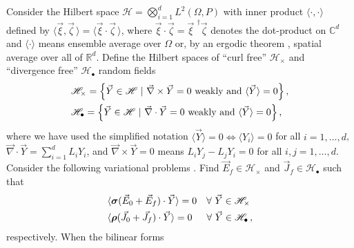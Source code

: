 \documentclass{cmslatex}
\newcommand\bsig{\mbox{\boldmath${\sigma}$}}
\newcommand\brho{\mbox{\boldmath${\rho}$}}
\begin{document}
Consider the Hilbert space $\mathscr{H}=\bigotimes_{i=1}^dL^2(\Omega,P)$ with inner
product $\langle\cdot,\cdot\rangle$ defined by $\langle\vec{\xi},\vec{\zeta}\,\rangle=\langle\vec{\xi}\cdot\vec{\zeta}\,\rangle$, where
$\vec{\xi}\cdot\vec{\zeta}=\vec{\xi}^{\;\,\dagger}\vec{\zeta}$ denotes the dot-product 
on $\mathbb{C}^d$ and $\langle\cdot\rangle$ means ensemble average over $\Omega$ or, by an
ergodic theorem \cite{Golden:CMP-473}, spatial average over all of
${\mathbb{R}}^d$. Define the Hilbert spaces \cite{Golden:CMP-473} of
``curl free'' $\mathscr{H}_\times$ and ``divergence free''
$\mathscr{H}_{\bullet}$ random fields  
%
\begin{align}\label{eq:curlfreeHilbert}
  &\mathscr{H}_\times=
  \left\{\vec{Y}\in \mathscr{H} \ | \ \vec{\nabla} \times\vec{Y}=0 \text{ weakly and }
    \langle\vec{Y}\rangle=0
  \right\}, \\
&\mathscr{H}_{\bullet}=
\left\{\vec{Y}\in \mathscr{H} \ | \ \vec{\nabla}\cdot\vec{Y}=0 \text{ weakly and }
    \langle\vec{Y}\rangle=0\right\},\notag 
\end{align}  
%
%
where we have used the simplified notation $\langle\vec{Y}\rangle=0 \iff \langle Y_i\rangle=0$ for
all $i=1,\ldots,d$, $\vec{\nabla}\cdot\vec{Y}=\sum_{i=1}^dL_iY_i$, and $\vec{\nabla} \times\vec{Y}=0$
means $L_iY_j-L_jY_i=0$ for all $i,j=1,\ldots,d$. Consider the following
variational problems \cite{Golden:CMP-473}. Find
$\vec{E}_f\in\mathscr{H}_\times$ and $\vec{J}_f\in\mathscr{H}_\bullet$ such that     
%
\begin{align}
 \label{eq:Weak_Curl_Free_Variational_Form}
 &\langle\bsig(\vec{E}_0+\vec{E}_f)\cdot\vec{Y}\rangle=0 \quad
 \forall \  \vec{Y}\in\mathscr{H}_\times 
\\
 &\langle\brho(\vec{J}_0+\vec{J}_f)\cdot\vec{Y}\rangle=0 \quad
 \hspace{0.5em}\forall \ \vec{Y}\in\mathscr{H}_{\bullet}\,,
  \notag
\end{align}
%
respectively. When the bilinear forms
\end{document}
